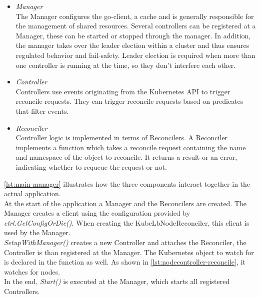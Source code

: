 \begin{itemize}
    \item \textit{Manager} \\
    The Manager configures the go-client, a cache and is generally responsible for the management of shared resources.
    Several controllers can be registered at a Manager, these can be started or stopped through the manager.
    In addition, the manager takes over the leader election within a cluster and thus ensures regulated behavior and fail-safety.
	Leader election is required when more than one controller is running at the time, so they don't interfere each other.
    \item \textit{Controller} \\
    Controllers use events originating from the Kubernetes API to trigger reconcile requests.
    They can trigger reconcile requests based on predicates that filter events.
    \item \textit{Reconciler} \\
    Controller logic is implemented in terms of Reconcilers.
    A Reconciler implements a function which takes a reconcile request containing the name and namespace of the object to reconcile.
    It returns a result or an error, indicating whether to requeue the request or not.
\end{itemize}

\newpage

\autoref{lst:main-manager} illustrates how the three components interact together in the actual application.
\\
At the start of the application a Manager and the Reconcilers are created.
The Manager creates a client using the configuration provided by \textit{ctrl.GetConfigOrDie()}.
When creating the KubeLbNodeReconciler, this client is used by the Manager.
\\
\textit{SetupWithManager()} creates a new Controller and attaches the Reconciler, the Controller is than registered at the Manager.
The Kubernetes object to watch for is declared in the function as well.
As shown in \autoref{lst:nodecontroller-reconcile}, it watches for nodes.
\\
In the end, \textit{Start()} is executed at the Manager, which starts all registered Controllers.

